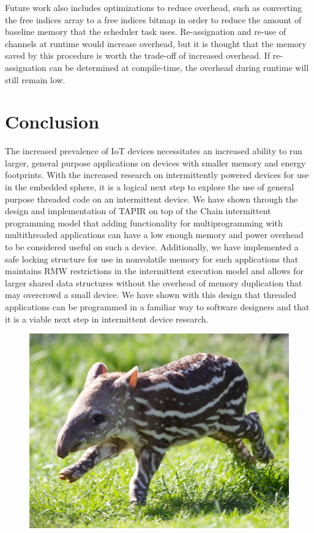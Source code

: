 \documentclass[11pt]{sensys-proc}
\begin{document}
Future work also includes optimizations to reduce overhead, such as converting
the free indices array to a free indices bitmap in order to reduce the amount of
baseline memory that the scheduler task uses.  Re-assignation and re-use of
channels at runtime would increase overhead, but it is thought that the memory
saved by this procedure is worth the trade-off of increased overhead.  If
re-assignation can be determined at compile-time, the overhead during runtime
will still remain low.

\section{Conclusion}
The increased prevalence of IoT devices necessitates an increased ability to
run larger, general purpose applications on devices with smaller memory and
energy footprints. With the increased research on intermittently powered devices
for use in the embedded sphere, it is a logical next step to explore the use
of general purpose threaded code on an intermittent device. We have shown
through the design and implementation of TAPIR on top of the Chain intermittent
programming model that adding functionality for multiprogramming with
multithreaded applications can have a low enough memory and power overhead to be
considered useful on such a device. Additionally, we have implemented a safe
locking structure for use in nonvolatile memory for such applications that
maintains RMW restrictions in the intermittent execution model and allows
for larger shared data structures without the overhead of memory duplication
that may overcrowd a small device. We have shown with this design that threaded
applications can be programmed in a familiar way to software designers and that
it is a viable next step in intermittent device research.

\begin{figure}[ht]
  \centering
  \includegraphics[width=0.9\columnwidth]{figs/tapir}
\end{figure}


\balance

\end{document}
